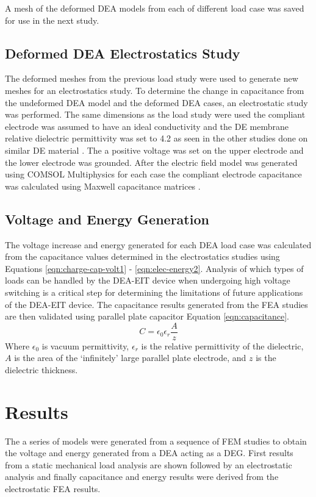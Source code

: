A mesh of the deformed DEA models from each of different load case was saved for use in the next study.


\subsection{Deformed DEA Electrostatics Study}
The deformed meshes from the previous load study were used to generate new meshes for an electrostatics study. To determine the change in capacitance from the undeformed DEA model and the deformed DEA cases, an electrostatic study was performed. The same dimensions as the load study were used the compliant electrode was assumed to have an ideal conductivity and the DE membrane relative dielectric permittivity was set to 4.2 as seen in the other studies done on similar DE material \cite{Pan2015}. The a positive voltage was set on the upper electrode and the lower electrode was grounded. After the electric field model was generated using COMSOL Multiphysics \cite{COMSOL2022} for each case the compliant electrode capacitance was calculated using Maxwell capacitance matrices \cite{Smolic2021} . 


\subsection{Voltage and Energy Generation}
The voltage increase and energy generated for each DEA load case was calculated from the capacitance values determined in the electrostatics studies using Equations \ref{eqn:charge-cap-volt1} - \ref{eqn:elec-energy2}. Analysis of which types of loads can be handled by the DEA-EIT device when undergoing high voltage switching is a critical step for determining the limitations of future applications of the DEA-EIT device. The capacitance results generated from the FEA studies are then validated using parallel plate capacitor Equation \ref{eqn:capacitance}.
\begin{equation}
	C = \epsilon_0 \epsilon_r \frac{A}{z}
	\label{eqn:capacitance}
\end{equation}
Where $\epsilon_0$ is vacuum permittivity, $\epsilon_r$ is the relative permittivity of the dielectric, $A$ is the area of the `infinitely' large parallel plate electrode, and $z$ is the dielectric thickness.


\section{Results}
\label{sec:results}
The a series of models were generated from a sequence of FEM studies to obtain the voltage and energy generated from a DEA acting as a DEG. First results from a static mechanical load analysis are shown followed by an electrostatic analysis and finally capacitance and energy results were derived from the electrostatic FEA results.


